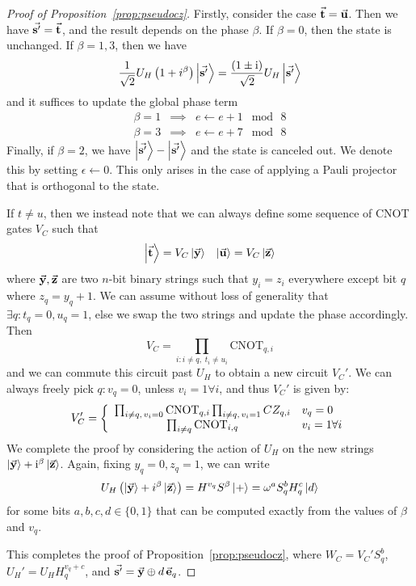 \begin{proof}[Proof of Proposition~\ref{prop:pseudocz}]
Firstly, consider the case $\va{t}=\va{u}$. Then we have $\va{s'}=\va{t}$, and the result depends on the phase $\beta$. If $\beta=0$, then the state is unchanged. If $\beta =1,3$, then we have
\[\frac{1}{\sqrt{2}}U_{H}\left(1+i^{\beta}\right)\ket{\va{s'}} = \frac{\left(1\pm \mathrm{i}\right)}{\sqrt{2}}U_{H}\ket{\va{s'}}\]
and it suffices to update the global phase term
\[
\begin{array}{rcl}
\beta = 1 & \implies & e\gets e+1\;\bmod\, 8\\
\beta=3 & \implies & e\gets e+7\;\bmod\,8
\end{array}\]
Finally, if $\beta=2$, we have $\ket{\va{s'}}-\ket{\va{s'}}$ and the state is canceled out. We denote this by setting $\epsilon\gets 0$. This only arises in the case of applying a Pauli projector that is orthogonal to the state.\par
If $t\neq u$, then we instead note that we can always define some sequence of CNOT gates $V_{C}$ such that
\[
\begin{array}{lr}
\ket{\va{t}}=V_{C}\ket{\va{y}} & \ket{\va{u}} = V_{C}\ket{\va{z}}
\end{array}
\]
where $\va{y},\va{z}$ are two $n$-bit binary strings such that $y_{i}=z_{i}$ everywhere except bit $q$ where $z_{q}=y_{q} + 1$. We can assume without loss of generality that $\exists q:t_{q}=0,u_{q}=1$, else we swap the two strings and update the phase accordingly. Then
\[V_{C} = \prod_{i: i\neq q,\;t_{i}\neq u_{i}}\text{CNOT}_{q,i}\]
and we can commute this circuit past $U_{H}$ to obtain a new circuit $V_{C}'$. We can always freely pick $q:v_{q}=0$, unless $v_{i}=1\forall i$, and thus $V_{C}'$ is given by:
\[V_{C}' = \left\{ \begin{array}{c l}
\prod_{i\neq q,\,v_{i}=0} \text{CNOT}_{q,i}\prod_{i\neq q,\,v_{i}=1}CZ_{q,i} & v_{q}=0 \\ 
\prod_{i\neq q} \text{CNOT}_{i,q} & v_{i}=1 \forall i \\
\end{array} \right.
\]
We complete the proof by considering the action of $U_{H}$ on the new strings $\ket{\va{y}}+\mathrm{i}^{\beta}\ket{\va{z}}$. Again, fixing $y_{q}=0,z_{q}=1$, we can write
\[
U_{H}\left(\ket{\va{y}}+i^{\beta}\ket{\va{z}}\right) = H^{v_{q}} S^{\beta}\ket{+} = \omega^{a}S_{q}^{b}H_{q}^{c}\ket{d}
\]
for some bits $a,b,c,d\in\{0,1\}$ that can be computed exactly from the values of $\beta$ and $v_{q}$.\par
This completes the proof of Proposition~\ref{prop:pseudocz}, where $W_{C}=V_{C}'S_{q}^{b}$, $U_{H}'=U_{H}H^{v_{q}+c}_{q}$, and $\va{s'}=\va{y}\oplus d\,\va{e}_{q}$.
\end{proof}
